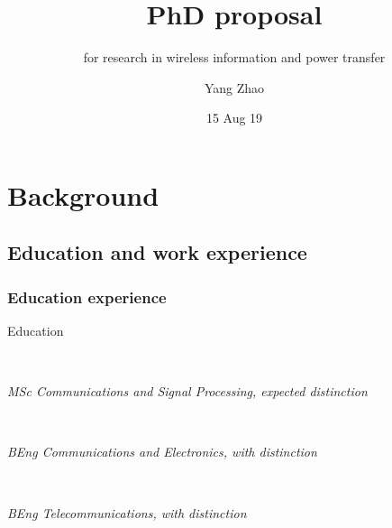 \documentclass{beamer}
\title{PhD proposal}
\subtitle{for research in wireless information and power transfer}
\author{Yang Zhao}
\date{15 Aug 19}
\begin{document}
\frame{\titlepage}



\section{Background}
\subsection{Education and work experience}

\begin{frame}
\frametitle{Education experience}

\begin{block}{Education}

\begin{minipage}[t]{0.7\textwidth}
\end{minipage}
~
\begin{minipage}[t]{0.2\textwidth}
\end{minipage}

\textit{MSc Communications and Signal Processing, expected distinction} \\

\begin{minipage}[t]{0.7\textwidth}
\end{minipage}
~
\begin{minipage}[t]{0.2\textwidth}
\end{minipage}

\textit{BEng Communications and Electronics, with distinction} \\

\begin{minipage}[t]{0.7\textwidth}
\end{minipage}
~
\begin{minipage}[t]{0.2\textwidth}
\end{minipage}

\textit{BEng Telecommunications, with distinction}
\end{block}

\end{frame}
\end{document}
